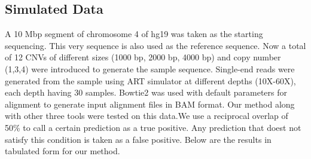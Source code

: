 \documentclass[twocolumn,oneside,conference]
{IEEEtran}
\begin{document}
\subsection{Simulated Data}
A 10 Mbp segment of chromosome 4 of hg19 was taken as the starting sequencing. This very sequence is also used as the reference sequence. Now a total of 12 CNVs of different sizes (1000 bp, 2000 bp, 4000 bp) and copy number (1,3,4) were introduced to generate the sample sequence. Single-end reads were generated from the sample using ART simulator \cite{21} at different depths (10X-60X), each depth having 30 samples. Bowtie2 \cite{22} was used with default parameters for alignment to generate input alignment files in BAM format. Our method along with other three tools were tested on this data.We use a reciprocal overlap of 50\% to call a certain prediction as a true positive. Any prediction that doest not satisfy this condition is taken as a false positive. Below are the results in tabulated form for our method.
\end{document}
